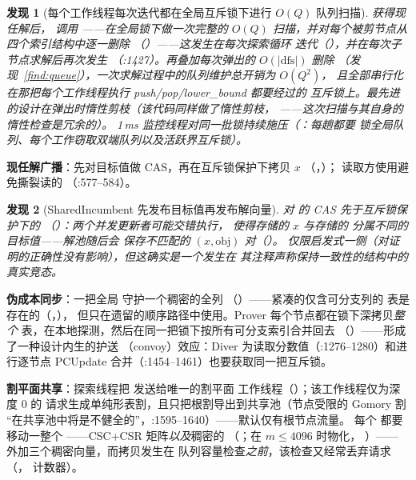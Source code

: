 \documentclass[11pt]{ctexart}
\newtheorem{finding}{发现}
\begin{document}
\begin{finding}[每个工作线程每次迭代都在全局互斥锁下进行 $O(Q)$ 队列扫描]
\label{find:queue-sweeps}
获得现任解后， 调用
——在全局锁下做一次完整的
$O(Q)$ 扫描，并对每个被剪节点从四个索引结构中逐一删除
（）——这发生在\emph{每次}探索循环
迭代（），并在每次子节点求解后再次发生
（:1427）。再叠加每次弹出的 $O(|\mathrm{dfs}|)$ 删除
（发现~\ref{find:queue}），一次求解过程中的队列维护总开销为 $O(Q^2)$，
且全部串行化在那把每个工作线程执行 push/pop/lower\_bound 都要经过的
互斥锁上。最先进的设计在弹出时惰性剪枝（该代码\emph{同样}做了惰性剪枝，
——这次扫描与其自身的惰性检查是冗余的）。
1\,ms 监控线程对同一批锁持续施压（：每趟都要
锁全局队列、\emph{每个}工作窃取双端队列以及活跃界互斥锁）。
\end{finding}

\textbf{现任解广播}：先对目标值做 CAS，再在互斥锁保护下拷贝 $x$
（，）；
读取方使用避免撕裂读的 （:577--584）。

\begin{finding}[SharedIncumbent 先发布目标值再发布解向量]
对  的 CAS 先于互斥锁保护下的 
（）：两个并发更新者可能交错执行，
使得存储的 $x$ 与存储的  分属不同的目标值——解池随后会
保存不匹配的 $(x, \mathrm{obj})$ 对（）。
仅限启发式一侧（对证明的正确性没有影响），但这确实是一个发生在
其注释声称保持一致性的结构中的真实竞态。
\end{finding}

\textbf{伪成本同步}：一把全局  守护一个稠密的全列
（）——紧凑的仅含可分支列的
表是存在的（，），
但只在遗留的顺序路径中使用。Prover 每个节点都在锁下深拷贝\emph{整个}
表，在本地探测，然后在同一把锁下按所有可分支索引合并回去
（）——形成了一种设计内生的护送
（convoy）效应：Diver 为读取分数值（:1276--1280）和进行逐节点
PCUpdate 合并（:1454--1461）也要获取同一把互斥锁。

\textbf{割平面共享}：探索线程把  发送给唯一的割平面
工作线程（）；该工作线程仅为深度 0 的
请求生成单纯形表割，且只把根割导出到共享池（节点受限的 Gomory 割
“在共享池中将是不健全的”，:1595--1640）——默认仅有根节点流量。
每个  都要移动一整个 ——CSC+CSR
矩阵\emph{以及}稠密的 
（；在 $m \le 4096$ 时物化，
）——外加三个稠密向量，而拷贝发生在
队列容量检查\emph{之前}，该检查又经常丢弃请求
（， 计数器）。
\end{document}
